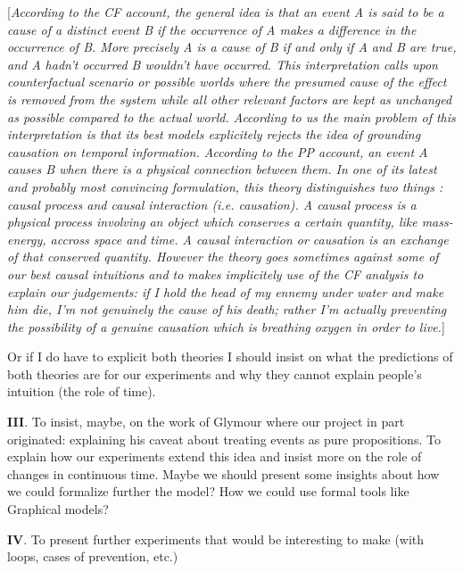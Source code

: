 \documentclass[10pt,letterpaper]{article}
\begin{document}
[\textit{According to the CF account, the general idea is that an event A is said to be a cause of a distinct event B if the occurrence of A makes a difference in the occurrence of B. More precisely A is a cause of B if and only if A and B are true, and A hadn't occurred B wouldn't have occurred. This interpretation calls upon counterfactual scenario or possible worlds where the presumed cause of the effect is removed from the system while all other relevant factors are kept as unchanged as possible compared to the actual world. According to us the main problem of this interpretation is that its best models explicitely rejects the idea of grounding causation on temporal information.
According to the PP account, an event A causes B when there is a physical connection between them. In one of its latest and probably most convincing formulation, this theory distinguishes two things : causal process and causal interaction (i.e. causation). A causal process is a physical process involving an object which conserves a certain quantity, like mass-energy, accross space and time. A causal interaction or causation is an exchange of that conserved quantity. However the theory goes sometimes against some of our best causal intuitions and to makes implicitely use of the CF analysis to explain our judgements: if I hold the head of my ennemy under water and make him die, I'm not genuinely the cause of his death; rather I'm actually preventing the possibility of a genuine causation which is breathing oxygen in order to live.}]

Or if I do have to explicit both theories I should insist on what the predictions of both theories are for our experiments and why they cannot explain people's intuition (the role of time).

\textbf{III}. To insist, maybe, on the work of Glymour where our project in part originated: explaining his caveat about treating events as pure propositions. To explain how our experiments extend this idea and insist more on the role of changes in continuous time. Maybe we should present some insights about how we could formalize further the model? How we could use formal tools like Graphical models?

\textbf{IV}. To present further experiments that would be interesting to make (with loops, cases of prevention, etc.)


\nocite{halpernp01}



\setlength{\bibleftmargin}{.125in}
\setlength{\bibindent}{-\bibleftmargin}


\end{document}
